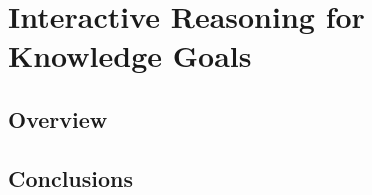 
\renewcommand{\thechapter}{3}

\chapter{Interactive Reasoning for Knowledge Goals}

\section{Overview}

\section{Conclusions}
